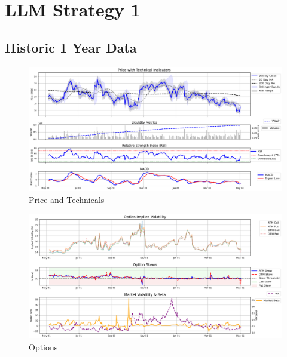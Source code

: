 \documentclass[8pt]{scrartcl}
\begin{document}
\newpage

\section*{LLM Strategy 1}
\label{app:s1}

\subsection*{Historic 1 Year Data}

\begin{figure}[H]
    \centering
    \includegraphics[width=1\linewidth]{judge_reviews//TSLA_M_gpt-4o-mini/2019-05-05/judge_Price_with_Technical_Indicators.png}
    \caption{Price and Technicals}
\end{figure}

\begin{figure}[H]
    \centering
    \includegraphics[width=1\linewidth]{judge_reviews/TSLA_M_gpt-4o-mini/2019-05-05/judge_Option_Implied_Volatility.png}
    \caption{Options}
\end{figure}
\end{document}
